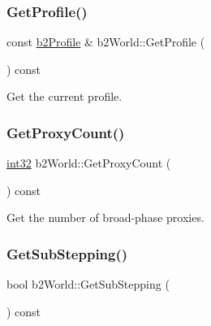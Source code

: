 \mbox{\label{classb2_world_aec4fb0a888e69e0db7f37a4921761711}} 
\subsubsection{\texorpdfstring{GetProfile()}{GetProfile()}}
{\footnotesize\ttfamily const \mbox{\hyperlink{structb2_profile}{b2\+Profile}} \& b2\+World\+::\+Get\+Profile (\begin{DoxyParamCaption}{ }\end{DoxyParamCaption}) const\hspace{0.3cm}{\ttfamily [inline]}}



Get the current profile. 

\mbox{\label{classb2_world_a088742d580bfc42531790ea8747bb8f8}} 
\subsubsection{\texorpdfstring{GetProxyCount()}{GetProxyCount()}}
{\footnotesize\ttfamily \mbox{\hyperlink{b2_settings_8h_a43d43196463bde49cb067f5c20ab8481}{int32}} b2\+World\+::\+Get\+Proxy\+Count (\begin{DoxyParamCaption}{ }\end{DoxyParamCaption}) const}



Get the number of broad-\/phase proxies. 

\mbox{\label{classb2_world_aa41f23e3e12f82ce229ce644ecdac28b}} 
\subsubsection{\texorpdfstring{GetSubStepping()}{GetSubStepping()}}
{\footnotesize\ttfamily bool b2\+World\+::\+Get\+Sub\+Stepping (\begin{DoxyParamCaption}{ }\end{DoxyParamCaption}) const\hspace{0.3cm}{\ttfamily [inline]}}

